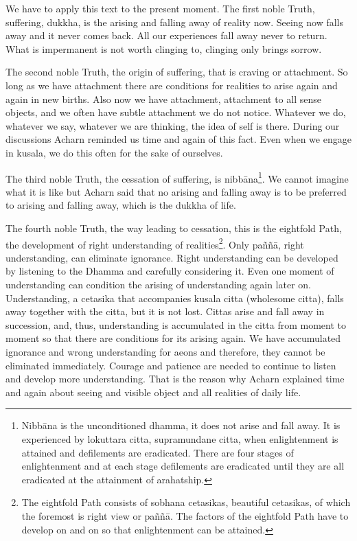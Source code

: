We have to apply this text to the present moment. The first noble Truth,
suffering, dukkha, is the arising and falling away of reality now.
Seeing now falls away and it never comes back. All our experiences fall
away never to return. What is impermanent is not worth clinging to,
clinging only brings sorrow.

The second noble Truth, the origin of suffering, that is craving or
attachment. So long as we have attachment there are conditions for
realities to arise again and again in new births. Also now we have
attachment, attachment to all sense objects, and we often have subtle
attachment we do not notice. Whatever we do, whatever we say, whatever
we are thinking, the idea of self is there. During our discussions
Acharn reminded us time and again of this fact. Even when we engage in
kusala, we do this often for the sake of ourselves.

The third noble Truth, the cessation of suffering, is nibbāna\footnote{Nibbāna is the
unconditioned dhamma, it does not arise and fall away. It is experienced
by lokuttara citta, supramundane citta, when enlightenment is attained
and defilements are eradicated. There are four stages of enlightenment
and at each stage defilements are eradicated until they are all
eradicated at the attainment of arahatship.}. We cannot imagine what
it is like but Acharn said that no arising and falling away is to be
preferred to arising and falling away, which is the dukkha of life.

The fourth noble Truth, the way leading to cessation, this is the
eightfold Path, the development of right understanding of realities\footnote{The eightfold Path
consists of sobhana cetasikas, beautiful cetasikas, of which the
foremost is right view or paññā. The factors of the eightfold Path have
to develop on and on so that enlightenment can be attained.}. Only paññā, right
understanding, can eliminate ignorance. Right understanding can be
developed by listening to the Dhamma and carefully considering it. Even
one moment of understanding can condition the arising of understanding
again later on. Understanding, a cetasika that accompanies kusala citta
(wholesome citta), falls away together with the citta, but it is not
lost. Cittas arise and fall away in succession, and, thus, understanding
is accumulated in the citta from moment to moment so that there are
conditions for its arising again. We have accumulated ignorance and
wrong understanding for aeons and therefore, they cannot be eliminated
immediately. Courage and patience are needed to continue to listen and
develop more understanding. That is the reason why Acharn explained time
and again about seeing and visible object and all realities of daily
life.

